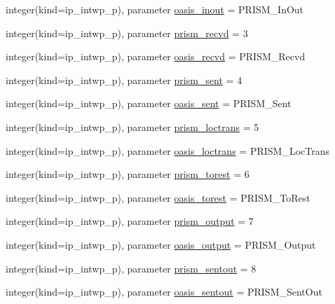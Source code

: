 \begin{DoxyCompactItemize}
\item 
integer(kind=ip\+\_\+intwp\+\_\+p), parameter \hyperlink{classmod__oasis__parameters_adc22f0871027f573ac705ca4593519f0}{oasis\+\_\+inout} = P\+R\+I\+S\+M\+\_\+\+In\+Out
\item 
integer(kind=ip\+\_\+intwp\+\_\+p), parameter \hyperlink{classmod__oasis__parameters_aa0bc3b208a1f962e5ec08916b36cae2d}{prism\+\_\+recvd} = 3
\item 
integer(kind=ip\+\_\+intwp\+\_\+p), parameter \hyperlink{classmod__oasis__parameters_a50fc92036d81ca0ea23918e1feddfe75}{oasis\+\_\+recvd} = P\+R\+I\+S\+M\+\_\+\+Recvd
\item 
integer(kind=ip\+\_\+intwp\+\_\+p), parameter \hyperlink{classmod__oasis__parameters_a403c181a893e178ee0ad6ec6f8d26c9c}{prism\+\_\+sent} = 4
\item 
integer(kind=ip\+\_\+intwp\+\_\+p), parameter \hyperlink{classmod__oasis__parameters_af739945ec2da833423cdc6e220e1c847}{oasis\+\_\+sent} = P\+R\+I\+S\+M\+\_\+\+Sent
\item 
integer(kind=ip\+\_\+intwp\+\_\+p), parameter \hyperlink{classmod__oasis__parameters_af9dc530c2cf2f0e5b5bb04fecb8373dd}{prism\+\_\+loctrans} = 5
\item 
integer(kind=ip\+\_\+intwp\+\_\+p), parameter \hyperlink{classmod__oasis__parameters_a8b206cc178182e3526d400ea7a6587b5}{oasis\+\_\+loctrans} = P\+R\+I\+S\+M\+\_\+\+Loc\+Trans
\item 
integer(kind=ip\+\_\+intwp\+\_\+p), parameter \hyperlink{classmod__oasis__parameters_a8d037fafc163f46260a8704f92a885a1}{prism\+\_\+torest} = 6
\item 
integer(kind=ip\+\_\+intwp\+\_\+p), parameter \hyperlink{classmod__oasis__parameters_a875abcc1cc679cb72f20d42d3dbfac97}{oasis\+\_\+torest} = P\+R\+I\+S\+M\+\_\+\+To\+Rest
\item 
integer(kind=ip\+\_\+intwp\+\_\+p), parameter \hyperlink{classmod__oasis__parameters_adc510873316710fd71696fabcc34f336}{prism\+\_\+output} = 7
\item 
integer(kind=ip\+\_\+intwp\+\_\+p), parameter \hyperlink{classmod__oasis__parameters_a7f9f81f3b1f2c8b09a460aeca27ea859}{oasis\+\_\+output} = P\+R\+I\+S\+M\+\_\+\+Output
\item 
integer(kind=ip\+\_\+intwp\+\_\+p), parameter \hyperlink{classmod__oasis__parameters_a9f683811203a8cf60704b4938a8f3a11}{prism\+\_\+sentout} = 8
\item 
integer(kind=ip\+\_\+intwp\+\_\+p), parameter \hyperlink{classmod__oasis__parameters_a1804e9b27d8d7ace38fd4c3f99ade6dd}{oasis\+\_\+sentout} = P\+R\+I\+S\+M\+\_\+\+Sent\+Out

\end{DoxyCompactItemize}
